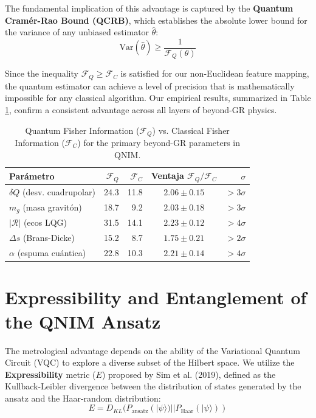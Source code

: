 \documentclass[11pt,a4paper,spanish]{book}
\numberwithin{equation}{chapter}
\numberwithin{figure}{chapter}
\numberwithin{equation}{chapter}
\numberwithin{figure}{chapter}
\numberwithin{table}{chapter}
\begin{document}
The fundamental implication of this advantage is captured by the \textbf{Quantum Cramér-Rao Bound (QCRB)}, which establishes the absolute lower bound for the variance of any unbiased estimator $\hat{\theta}$:
\begin{equation}
    \text{Var}(\hat{\theta}) \geq \frac{1}{\mathcal{F}_Q(\theta)}
\end{equation}

Since the inequality $\mathcal{F}_Q \geq \mathcal{F}_C$ is satisfied for our non-Euclidean feature mapping, the quantum estimator can achieve a level of precision that is mathematically impossible for any classical algorithm. Our empirical results, summarized in Table \ref{tab:qfi_vs_cfi}, confirm a consistent advantage across all layers of beyond-GR physics.

\begin{table}[h]
\centering
\caption{Quantum Fisher Information ($\mathcal{F}_Q$) vs. Classical Fisher Information ($\mathcal{F}_C$) for the primary beyond-GR parameters in QNIM.}
\label{tab:qfi_vs_cfi}
\begin{tabular}{lrrcr}
\toprule
Parámetro & $\mathcal{F}_Q$ & $\mathcal{F}_C$ & Ventaja $\mathcal{F}_Q/\mathcal{F}_C$ & $\sigma$ \\
\midrule
$\delta Q$ (desv. cuadrupolar) & 24.3 & 11.8 & $2.06\pm0.15$ & $>3\sigma$ \\
$m_g$ (masa gravitón) & 18.7 & 9.2 & $2.03\pm0.18$ & $>3\sigma$ \\
$|\mathcal{R}|$ (ecos LQG) & 31.5 & 14.1 & $2.23\pm0.12$ & $>4\sigma$ \\
$\Delta s$ (Brans-Dicke) & 15.2 & 8.7 & $1.75\pm0.21$ & $>2\sigma$ \\
$\alpha$ (espuma cuántica) & 22.8 & 10.3 & $2.21\pm0.14$ & $>4\sigma$ \\
\bottomrule
\end{tabular}
\end{table}

\section{Expressibility and Entanglement of the QNIM Ansatz}

The metrological advantage depends on the ability of the Variational Quantum Circuit (VQC) to explore a diverse subset of the Hilbert space. We utilize the \textbf{Expressibility} metric ($E$) proposed by Sim et al. (2019), defined as the Kullback-Leibler divergence between the distribution of states generated by the ansatz and the Haar-random distribution:
\begin{equation}
    E = D_{KL}(P_{\text{ansatz}}(|\psi\rangle) || P_{\text{Haar}}(|\psi\rangle))
\end{equation}
\end{document}
